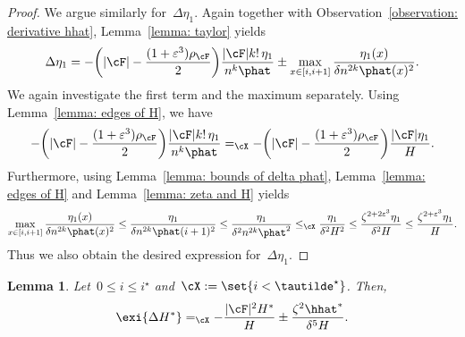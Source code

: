 \documentclass[11pt]{amsart}
\newcommand{\eps}{\varepsilon}
\DeclarePairedDelimiter{\paren}{\lparen}{\rparen}
\DeclarePairedDelimiter{\abs}{\lvert}{\rvert}
\newcommand{\Xleq}{\leq_{\cX}}
\newcommand{\Xeq}{=_{\cX}}
\newtheorem{lemma}[algocf]{Lemma}
\theoremstyle{definition}
\numberwithin{equation}{section}
\begin{document}
\begin{proof}
		We argue similarly for~$\Delta\eta_1$.
		Again together with Observation~\ref{observation: derivative hhat}, Lemma~\ref{lemma: taylor} yields
		\begin{equation*}
			\Delta\eta_1
			=-\paren[\bigg]{\abs{\cF}-\frac{(1+\eps^3)\rho_\cF}{2}}\frac{\abs{\cF}k!\,\eta_1}{n^k\phat}\pm \max_{x\in[i,i+1]}\frac{\eta_1(x)}{\delta n^{2k}\phat(x)^2}.
		\end{equation*}
		We again investigate the first term and the maximum separately.
		Using Lemma~\ref{lemma: edges of H}, we have
		\begin{equation*}
			-\paren[\bigg]{\abs{\cF}-\frac{(1+\eps^3)\rho_\cF}{2}}\frac{\abs{\cF}k!\,\eta_1}{n^k\phat}
			\Xeq-\paren[\bigg]{\abs{\cF}-\frac{(1+\eps^3)\rho_\cF}{2}}\frac{\abs{\cF}\eta_1}{H}.
		\end{equation*}
		Furthermore, using Lemma~\ref{lemma: bounds of delta phat}, Lemma~\ref{lemma: edges of H} and Lemma~\ref{lemma: zeta and H} yields
		\begin{equation*}
			\max_{x\in[i,i+1]}\frac{\eta_1(x)}{\delta n^{2k}\phat(x)^2}
			\leq \frac{\eta_1}{\delta n^{2k}\phat(i+1) ^2}
			\leq \frac{\eta_1}{\delta^2 n^{2k}\phat^2}
			\Xleq \frac{\eta_1}{\delta^2 H^2}
			\leq \frac{\zeta^{2+2\eps^3}\eta_1}{\delta^2 H}
			\leq \frac{\zeta^{2+\eps^3}\eta_1}{H}.
		\end{equation*}
		Thus we also obtain the desired expression for~$\Delta\eta_1$.
	\end{proof}
	
	
	\begin{lemma}\label{lemma: copy trend}
		Let~$0\leq i\leq i^\star$ and~$\cX:=\set{i< \tautilde^\star}$.
		Then,
		\begin{equation*}
			\exi{\Delta H^*}\Xeq -\frac{\abs{\cF}^2H^*}{H}\pm \frac{\zeta^{2}\hhat^*}{\delta^5 H}.
		\end{equation*}
	\end{lemma}
	
\end{document}
